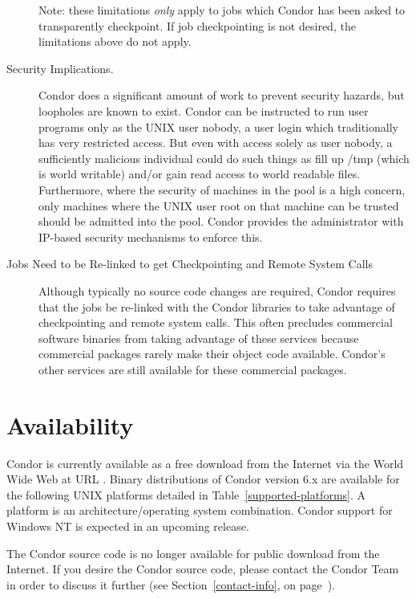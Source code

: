 \begin{description}
	Note: these limitations \emph{only} apply to jobs which Condor
has been asked to transparently checkpoint.  If job checkpointing is not
desired, the limitations above do not apply.

	\item[Security Implications.] Condor does a significant amount of work to prevent 
security hazards, but loopholes are known to exist.  Condor can be instructed 
to run user programs only as the UNIX user nobody, a user login which traditionally has very 
restricted access.  But even with access solely as user nobody, a sufficiently 
malicious individual could do such things as fill up /tmp (which is world writable) and/or gain 
read access to world readable files.
Furthermore, where the security of machines in the pool is a high concern, 
only machines where the UNIX user root on that machine can be trusted should be admitted
into the pool. Condor provides the administrator with IP-based security mechanisms 
to enforce this.

	\item[Jobs Need to be Re-linked to get Checkpointing and Remote System Calls] Although 
typically no source code changes are required,
Condor requires
that the jobs be re-linked with the Condor libraries to take
advantage of checkpointing and remote system calls. This often
precludes commercial software binaries from taking advantage of these services
because commercial packages rarely make their object code
available. 
Condor's other services are still available for these commercial packages.

\end{description}

\section{Availability}
Condor is currently available as a free download from the Internet via the World Wide Web at  
URL .
Binary distributions of Condor version 6.x are available for the following UNIX platforms 
detailed in Table~\ref{supported-platforms}.  A platform is an 
architecture/operating system combination.  Condor support for Windows NT is 
expected in an upcoming release.

The Condor source code is no longer available for public download from the Internet.  If you 
desire the Condor source code, please contact the Condor Team in order to discuss it further 
(see Section~\ref{contact-info}, on page~\pageref{contact-info}).

